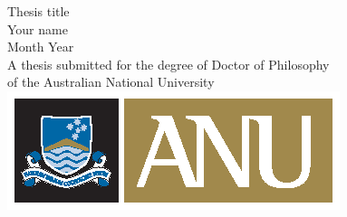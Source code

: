 \begin{titlepage}
\begin{center}

\vspace*{\fill} \Huge
                        Thesis title
\\
\vfill\vfill\Large
                          Your name
\\
\vfill\vfill
                          Month Year
\\
\vfill\vfill \normalsize
         A thesis submitted for the degree of Doctor of Philosophy\\
         of the Australian National University
\vfill
         \includegraphics{ANU.eps}

\end{center}

\end{titlepage}
